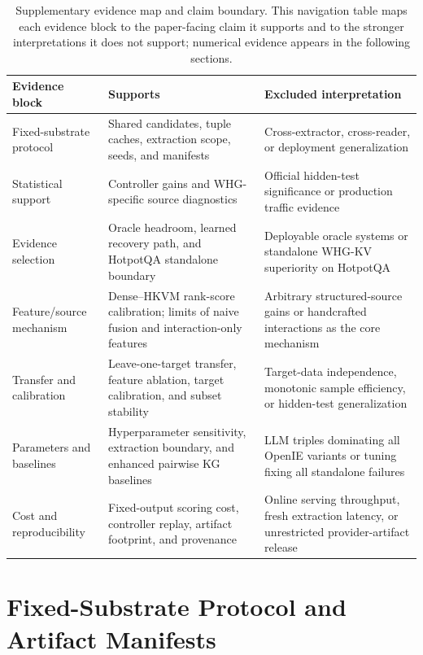 \documentclass[conference]{IEEEtran}
\begin{document}
\begin{table}[t]
\caption{Supplementary evidence map and claim boundary. This navigation table maps each evidence block to the paper-facing claim it supports and to the stronger interpretations it does not support; numerical evidence appears in the following sections.}
\label{tab:supp_evidence_map}
\centering
\small
\setlength{\tabcolsep}{4pt}
\begin{tabular}{@{}L{0.20\textwidth}L{0.37\textwidth}L{0.37\textwidth}@{}}
\toprule
Evidence block & Supports & Excluded interpretation \\
\midrule
Fixed-substrate protocol & Shared candidates, tuple caches, extraction scope, seeds, and manifests & Cross-extractor, cross-reader, or deployment generalization \\
Statistical support & Controller gains and WHG-specific source diagnostics & Official hidden-test significance or production traffic evidence \\
Evidence selection & Oracle headroom, learned recovery path, and HotpotQA standalone boundary & Deployable oracle systems or standalone WHG-KV superiority on HotpotQA \\
Feature/source mechanism & Dense--HKVM rank-score calibration; limits of naive fusion and interaction-only features & Arbitrary structured-source gains or handcrafted interactions as the core mechanism \\
Transfer and calibration & Leave-one-target transfer, feature ablation, target calibration, and subset stability & Target-data independence, monotonic sample efficiency, or hidden-test generalization \\
Parameters and baselines & Hyperparameter sensitivity, extraction boundary, and enhanced pairwise KG baselines & LLM triples dominating all OpenIE variants or tuning fixing all standalone failures \\
Cost and reproducibility & Fixed-output scoring cost, controller replay, artifact footprint, and provenance & Online serving throughput, fresh extraction latency, or unrestricted provider-artifact release \\
\bottomrule
\end{tabular}
\end{table}

\section{Fixed-Substrate Protocol and Artifact Manifests}
\end{document}
